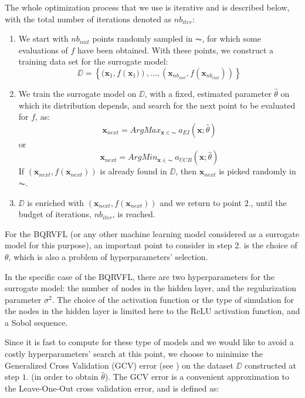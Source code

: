 \medskip 

The whole optimization process that we use is iterative and is described below, with the total number of iterations denoted as $nb_{iter}$: 

\begin{enumerate}
\item We start with $nb_{init}$ points randomly sampled in $\AC$, for which some evaluations of $f$ have been obtained. With these points, we construct a training data set for the surrogate model:
$$
\DD = \left \lbrace (\textbf{x}_1, f\left(\textbf{x}_1)\right), \ldots,  (\textbf{x}_{nb_{init}}, f(\textbf{x}_{nb_{init}}))\right \rbrace
$$
\item We train the surrogate model on $\DD$, with a fixed, estimated parameter $\hat{\theta}$ on which its distribution depends, and search for the next point to be evaluated for $f$, as: 
$$
\textbf{x}_{next} = ArgMax_{\textbf{x} \in \AC} \: a_{EI}(\textbf{x}; \hat{\theta})
$$ or 
$$
\textbf{x}_{next} = ArgMin_{\textbf{x} \in \AC} \: a_{UCB}(\textbf{x}; \hat{\theta})
$$
If $\left(\textbf{x}_{next}, f(\textbf{x}_{next})\right)$ is already found in $\DD$, then $\textbf{x}_{next}$ is picked randomly in $\AC$.
\item $\DD$ is enriched with $(\textbf{x}_{next}, f(\textbf{x}_{next}))$ and we return to point $2.$, until the budget of iterations, $nb_{iter}$, is reached.
\end{enumerate}

For the BQRVFL (or any other machine learning model considered as a surrogate model for this purpose), an important point to consider in step $2.$ is the choice of $\theta$, which is also a problem of hyperparameters' selection. 

In the specific case of the BQRVFL, there are two hyperparameters for the surrogate model: the number of nodes in the hidden layer, and the regularization parameter $\sigma^2$. The choice of the activation function or the type of simulation for the nodes in the hidden layer is limited here to the ReLU activation function, and a Sobol sequence. 

Since it is fast to compute for these type of models and we would like to avoid a costly hyperparameters' search at this point, we choose to minimize the Generalized Cross Validation (GCV) error (see \cite{golub1979generalized}) on the dataset $\DD$ constructed at step $1.$ (in order to obtain $\hat{\theta}$). The GCV error is a convenient approximation to the Leave-One-Out cross validation error, and is defined as: 

